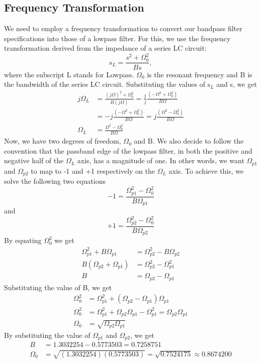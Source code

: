 \documentclass[12pt]{article}
\begin{document}
\subsection{Frequency Transformation}
We need to employ a frequency transformation to convert our bandpass filter specifications into those of a lowpass filter. For this, we use the frequency transformation derived from the impedance of a series LC circuit:
\[s_L = \frac{s^2 + \Omega_0^2}{Bs},\]
where the subscript L stands for Lowpass. $\Omega_0$ is the resonant frequency and B is the bandwidth of the series LC circuit. Substituting the values of s$_L$ and s, we get
\begin{align*}
    j\Omega_L &= \frac{(j\Omega)^2 + \Omega_0^2}{B(j\Omega)} = \frac{1}{j}\frac{(-\Omega^2 + \Omega_0^2)}{B\Omega}\\
    &= -j\frac{(-\Omega^2 + \Omega_0^2)}{B\Omega} = j\frac{(\Omega^2 - \Omega_0^2)}{B\Omega}\\
    \Omega_L &= \frac{\Omega^2 - \Omega_0^2}{B\Omega}
\end{align*}
Now, we have two degrees of freedom, $\Omega_0$ and B. We also decide to follow the convention that the passband edge of the lowpass filter, in both the positive and negative half of the $\Omega_L$ axis, has a magnitude of one. In other words, we want $\Omega_{p1}$ and $\Omega_{p2}$ to map to -1 and +1 respectively on the $\Omega_L$ axis. To achieve this, we solve the following two equations
\[-1 = \frac{\Omega_{p1}^2 - \Omega_0^2}{B\Omega_{p1}}\]
and
\[+1 = \frac{\Omega_{p2}^2 - \Omega_0^2}{B\Omega_{p2}}\]
By equating $\Omega_0^2$ we get
\begin{align*}
    \Omega_{p1}^2 + B\Omega_{p1} &= \Omega_{p2}^2 - B\Omega_{p2}\\
    B(\Omega_{p2} + \Omega_{p1}) &= \Omega_{p2}^2 - \Omega_{p1}^2\\
    B &= \Omega_{p2} - \Omega_{p1}
\end{align*}
Substituting the value of B, we get
\begin{align*}
    \Omega_0^2 &= \Omega_{p1}^2 + (\Omega_{p2} - \Omega_{p1})\Omega_{p1}\\
    \Omega_0^2 &= \Omega_{p1}^2 + \Omega_{p2}\Omega_{p1} - \Omega_{p1}^2 = \Omega_{p2}\Omega_{p1}\\
    \Omega_0 &= \sqrt{\Omega_{p2}\Omega_{p1}}
\end{align*}
By substituting the value of $\Omega_{p1}$ and $\Omega_{p2}$, we get
\begin{align*}
    B &= 1.3032254 - 0.5773503 = 0.7258751\\
    \Omega_0 &= \sqrt{(1.3032254)(0.5773503)} = \sqrt{0.7524175} \approx 0.8674200
\end{align*}
\end{document}
